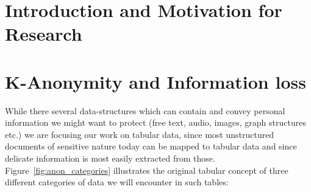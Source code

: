 \documentclass{llncs}
\begin{document}
\renewcommand{\thesubfigure}{\thefigure.\arabic{subfigure}}
\makeatletter
\renewcommand{\p@subfigure}{}
\renewcommand{\@thesubfigure}{\thesubfigure:\hskip\subfiglabelskip}
\makeatother


\section{Introduction and Motivation for Research}
\label{sect:introduction}


\section{K-Anonymity and Information loss}

While there several data-structures which can contain and convey personal information we might want to protect (free text, audio, images, graph structures etc.) we are focusing our work on tabular data, since most unstructured documents of sensitive nature today can be mapped to tabular data and since delicate information is most easily extracted from those. Figure~\ref{fig:anon_categories} illustrates the original tabular concept of three different categories of data we will encounter in such tables:
\end{document}
